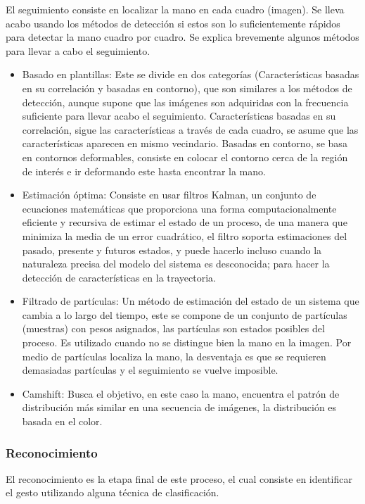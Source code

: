 El seguimiento consiste en localizar la mano en cada cuadro (imagen). Se lleva acabo usando los métodos de detección si estos son lo suficientemente rápidos para detectar la mano cuadro por cuadro. Se explica brevemente algunos  métodos para llevar a cabo el seguimiento. 
\begin{itemize}
	\item Basado en plantillas: Este se divide en dos categorías (Características basadas en su correlación y basadas en contorno), que son similares a los métodos de detección, aunque supone que las imágenes son adquiridas con la frecuencia suficiente para llevar acabo el seguimiento. Características basadas en su correlación, sigue las características a través de cada cuadro, se asume que las características aparecen en mismo vecindario. Basadas en contorno, se basa en contornos deformables, consiste en colocar el contorno cerca de la región de interés e ir deformando este hasta encontrar la mano. 
	\item Estimación óptima: Consiste en usar filtros Kalman, un conjunto de ecuaciones matemáticas que proporciona una forma  computacionalmente eficiente y recursiva de estimar el estado de un proceso, de una manera que minimiza la media de un error cuadrático, el filtro soporta estimaciones del pasado, presente y futuros estados, y puede hacerlo incluso cuando la naturaleza precisa del modelo del sistema es desconocida;  para hacer la detección de características en la trayectoria. 
	\item Filtrado de partículas: Un método de estimación del estado de un sistema que cambia a lo largo del tiempo, este se compone de un conjunto de partículas (muestras) con pesos asignados, las partículas son estados posibles del proceso. Es utilizado cuando no se distingue bien la mano en la imagen. Por medio de partículas localiza la mano, la desventaja es que se requieren demasiadas partículas y  el seguimiento se vuelve imposible. 
	\item Camshift: Busca el objetivo, en este caso la mano, encuentra el patrón de distribución más similar en una secuencia de imágenes, la distribución es basada en el color. 
\end{itemize}

\subsubsection{Reconocimiento}\label{sssec:EtapaReconocimiento}

El reconocimiento es la etapa final de este proceso, el cual consiste en identificar el gesto utilizando alguna técnica de clasificación.

